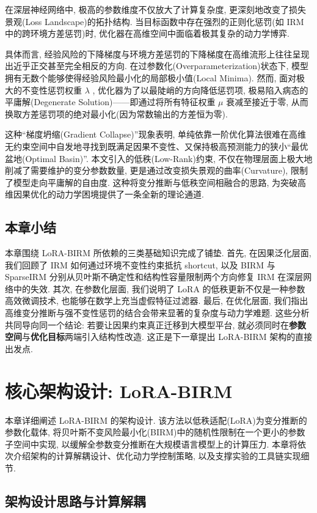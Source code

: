 \documentclass[a4paper,punct=banjiao,twoside]{ctexrep}
\theoremstyle{plain}
\theoremstyle{definition}
\theoremstyle{remark}
\begin{document}
在深层神经网络中, 极高的参数维度不仅放大了计算复杂度, 更深刻地改变了损失景观(Loss Landscape)的拓扑结构. 当目标函数中存在强烈的正则化惩罚(如 IRM 中的跨环境方差惩罚)时, 优化器在高维空间中面临着极其复杂的动力学博弈.

具体而言, 经验风险的下降梯度与环境方差惩罚的下降梯度在高维流形上往往呈现出近乎正交甚至完全相反的方向. 在过参数化(Overparameterization)状态下, 模型拥有无数个能够使得经验风险最小化的局部极小值(Local Minima). 然而, 面对极大的不变性惩罚权重 $\lambda$ , 优化器为了以最陡峭的方向降低惩罚项, 极易陷入病态的平庸解(Degenerate Solution)——即通过将所有特征权重 $\mu$ 衰减至接近于零, 从而换取方差惩罚项的绝对最小化(因为常数输出的方差恒为零).

这种“梯度坍缩(Gradient Collapse)”现象表明, 单纯依靠一阶优化算法很难在高维无约束空间中自发地寻找到既满足因果不变性、又保持极高预测能力的狭小“最优盆地(Optimal Basin)”. 本文引入的低秩(Low-Rank)约束, 不仅在物理层面上极大地削减了需要维护的变分参数数量, 更是通过改变损失景观的曲率(Curvature), 限制了模型走向平庸解的自由度. 这种将变分推断与低秩空间相融合的思路, 为突破高维因果优化的动力学困境提供了一条全新的理论通道.

\section{本章小结}

本章围绕 LoRA-BIRM 所依赖的三类基础知识完成了铺垫. 首先, 在因果泛化层面, 我们回顾了 IRM 如何通过环境不变性约束抵抗 shortcut, 以及 BIRM 与 SparseIRM 分别从贝叶斯不确定性和结构性容量限制两个方向修复 IRM 在深层网络中的失效. 其次, 在参数化层面, 我们说明了 LoRA 的低秩更新不仅是一种参数高效微调技术, 也能够在数学上充当虚假特征过滤器. 最后, 在优化层面, 我们指出高维变分推断与强不变性惩罚的结合会带来显著的复杂度与动力学难题. 这些分析共同导向同一个结论: 若要让因果约束真正迁移到大模型平台, 就必须同时在\textbf{参数空间}与\textbf{优化目标}两端引入结构性改造. 这正是下一章提出 LoRA-BIRM 架构的直接出发点.

\chapter{核心架构设计: LoRA-BIRM}

本章详细阐述 LoRA-BIRM 的架构设计. 该方法以低秩适配(LoRA)为变分推断的参数化载体, 将贝叶斯不变风险最小化(BIRM)中的随机性限制在一个更小的参数子空间中实现, 以缓解全参数变分推断在大规模语言模型上的计算压力. 本章将依次介绍架构的计算解耦设计、优化动力学控制策略, 以及支撑实验的工具链实现细节.

\section{架构设计思路与计算解耦}
\end{document}
